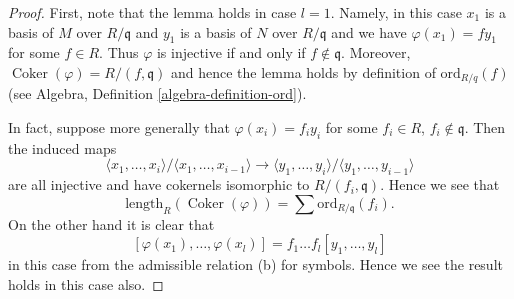 \documentclass[10pt,a4paper]{amsart}
\theoremstyle{plain}
\theoremstyle{definition}
\theoremstyle{remark}
\numberwithin{equation}{subsection}
\def\Coker{\mathop{\mathrm{Coker}}}
\begin{document}
\begin{proof}
First, note that the lemma holds in case $l = 1$.
Namely, in this case $x_1$ is a basis of $M$ over $R/\mathfrak q$
and $y_1$ is a basis of $N$ over $R/\mathfrak q$ and we have
$\varphi(x_1) = fy_1$ for some $f \in R$. Thus $\varphi$ is injective
if and only if $f \not \in \mathfrak q$. Moreover,
$\Coker(\varphi) = R/(f, \mathfrak q)$ and hence the lemma
holds by definition of $\text{ord}_{R/q}(f)$
(see Algebra, Definition \ref{algebra-definition-ord}).

\medskip\noindent
In fact, suppose more generally that $\varphi(x_i) = f_iy_i$ for some
$f_i \in R$, $f_i \not \in \mathfrak q$. Then the induced maps
$$
\langle x_1, \ldots, x_i\rangle / \langle x_1, \ldots, x_{i - 1}\rangle
\longrightarrow
\langle y_1, \ldots, y_i\rangle / \langle y_1, \ldots, y_{i - 1}\rangle
$$
are all injective and have cokernels isomorphic to
$R/(f_i, \mathfrak q)$. Hence we see that
$$
\text{length}_R(\Coker(\varphi)) = \sum \text{ord}_{R/\mathfrak q}(f_i).
$$
On the other hand it is clear that
$$
[\varphi(x_1), \ldots, \varphi(x_l)] = f_1 \ldots f_l [y_1, \ldots, y_l]
$$
in this case from the admissible relation (b) for symbols.
Hence we see the result holds in this case also.


\end{proof}
\end{document}
